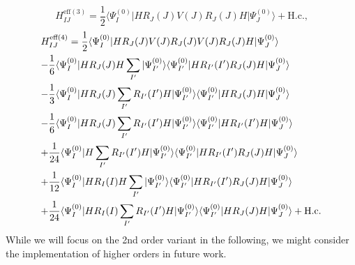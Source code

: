 	\begin{equation}H_{IJ}^{{\text{eff}}(3)} = \frac{1}{2}\langle \Psi _I^{(0)}|H{R_J}(J)V(J){R_J}(J)H|\Psi _J^{(0)}\rangle  + {\text{H}}{\text{.c}}{\text{.,}}\end{equation}
	\begin{equation}\begin{gathered}
  H_{IJ}^{{\text{eff}}(4)} = \frac{1}{2}\langle \Psi _I^{(0)}|H{R_J}(J)V(J){R_J}(J)V(J){R_J}(J)H|\Psi _J^{(0)}\rangle  \hfill \\
   - \frac{1}{6}\langle \Psi _I^{(0)}|H{R_J}(J)H\sum\limits_{I'} {|\Psi _{I'}^{(0)}\rangle \langle \Psi _{I'}^{(0)}|H{R_{I'}}(I')} {R_J}(J)H|\Psi _J^{(0)}\rangle  \hfill \\
   - \frac{1}{3}\langle \Psi _I^{(0)}|H{R_J}(J)\sum\limits_{I'} {{R_{I'}}(I')H|\Psi _{I'}^{(0)}\rangle \langle \Psi _{I'}^{(0)}|H} {R_J}(J)H|\Psi _J^{(0)}\rangle  \hfill \\
   - \frac{1}{6}\langle \Psi _I^{(0)}|H{R_J}(J)\sum\limits_{I'} {{R_{I'}}(I')H|\Psi _{I'}^{(0)}\rangle \langle \Psi _{I'}^{(0)}|H} {R_{I'}}(I')H|\Psi _J^{(0)}\rangle  \hfill \\
   + \frac{1}{{24}}\langle \Psi _I^{(0)}|H\sum\limits_{I'} {{R_{I'}}} (I')H|\Psi _{I'}^{(0)}\rangle \langle \Psi _{I'}^{(0)}|H{R_{I'}}(I'){R_J}(J)H|\Psi _J^{(0)}\rangle  \hfill \\
   + \frac{1}{{12}}\langle \Psi _I^{(0)}|H{R_I}(I)H\sum\limits_{I'} {|\Psi _{I'}^{(0)}\rangle \langle \Psi _{I'}^{(0)}|H{R_{I'}}} (I'){R_J}(J)H|\Psi _J^{(0)}\rangle  \hfill \\
   + \frac{1}{{24}}\langle \Psi _I^{(0)}|H{R_I}(I)\sum\limits_{I'} {{R_{I'}}} (I')H|\Psi _{I'}^{(0)}\rangle \langle \Psi _{I'}^{(0)}|H{R_J}(J)H|\Psi _J^{(0)}\rangle  + {\text{H}}{\text{.c}}{\text{.}} \hfill \\ 
\end{gathered} \end{equation}
While we will focus on the 2nd order variant in the following, we might consider the implementation of higher orders in future work.

